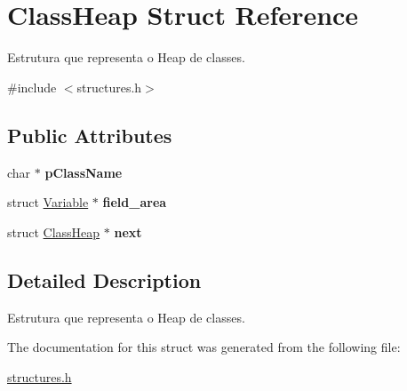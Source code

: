 \hypertarget{structClassHeap}{}\section{Class\+Heap Struct Reference}
\label{structClassHeap}


Estrutura que representa o Heap de classes.  




{\ttfamily \#include $<$structures.\+h$>$}

\subsection*{Public Attributes}
\begin{DoxyCompactItemize}
\item 
\mbox{\label{structClassHeap_a6f65425f32cc49fefc496946726e0783}} 
char $\ast$ {\bfseries p\+Class\+Name}
\item 
\mbox{\label{structClassHeap_a88485666f5f36a2fbeddf4e1dee65907}} 
struct \mbox{\hyperlink{structVariable}{Variable}} $\ast$ {\bfseries field\+\_\+area}
\item 
\mbox{\label{structClassHeap_a692779f60f55756a48b2741025d930ad}} 
struct \mbox{\hyperlink{structClassHeap}{Class\+Heap}} $\ast$ {\bfseries next}
\end{DoxyCompactItemize}


\subsection{Detailed Description}
Estrutura que representa o Heap de classes. 

The documentation for this struct was generated from the following file\+:\begin{DoxyCompactItemize}
\item 
\mbox{\hyperlink{structures_8h}{structures.\+h}}\end{DoxyCompactItemize}
